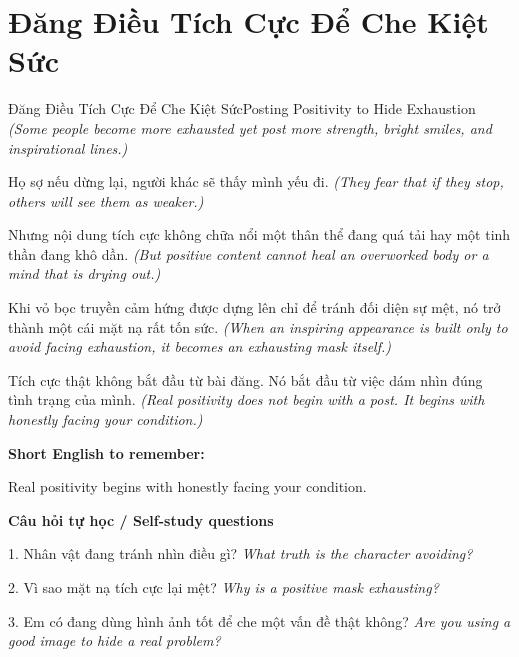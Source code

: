 \section{Đăng Điều Tích Cực Để Che Kiệt Sức}
\begin{truyen}{Đăng Điều Tích Cực Để Che Kiệt Sức}{Posting Positivity to Hide Exhaustion}
\textit{(Some people become more exhausted yet post more strength, bright smiles, and inspirational lines.)}

Họ sợ nếu dừng lại, người khác sẽ thấy mình yếu đi.
\textit{(They fear that if they stop, others will see them as weaker.)}

Nhưng nội dung tích cực không chữa nổi một thân thể đang quá tải hay một tinh thần đang khô dần.
\textit{(But positive content cannot heal an overworked body or a mind that is drying out.)}

Khi vỏ bọc truyền cảm hứng được dựng lên chỉ để tránh đối diện sự mệt, nó trở thành một cái mặt nạ rất tốn sức.
\textit{(When an inspiring appearance is built only to avoid facing exhaustion, it becomes an exhausting mask itself.)}

\end{truyen}

\begin{baihoc}
Tích cực thật không bắt đầu từ bài đăng. Nó bắt đầu từ việc dám nhìn đúng tình trạng của mình.
\textit{(Real positivity does not begin with a post. It begins with honestly facing your condition.)}
\end{baihoc}

\begin{ghinhoanh}
\textbf{Short English to remember:}

Real positivity begins with honestly facing your condition.

\end{ghinhoanh}

\begin{tuhocnhanh}
\textbf{Câu hỏi tự học / Self-study questions}

1. Nhân vật đang tránh nhìn điều gì? \textit{What truth is the character avoiding?}

2. Vì sao mặt nạ tích cực lại mệt? \textit{Why is a positive mask exhausting?}

3. Em có đang dùng hình ảnh tốt để che một vấn đề thật không? \textit{Are you using a good image to hide a real problem?}
\end{tuhocnhanh}
\ngancach

